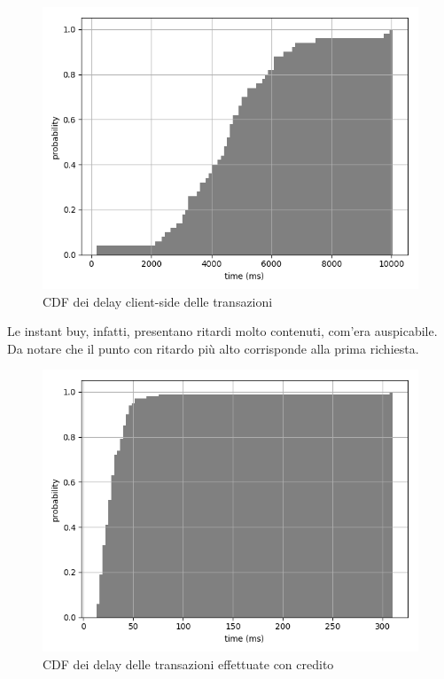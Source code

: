 \begin{figure}[h!t]
\centerline{\includegraphics[width=\textwidth]{img/client-side-delay-grey}}
\caption{CDF dei delay client-side delle transazioni}
\label{f:calcoli:client}
\end{figure}

Le instant buy, infatti, presentano ritardi molto contenuti, com'era auspicabile. Da notare che il punto con ritardo più alto corrisponde alla prima richiesta.

\begin{figure}[h!t]
\centerline{\includegraphics[width=\textwidth]{img/instant-buy-delay-grey}}
\caption{CDF dei delay delle transazioni effettuate con credito}
\label{f:calcoli:instant}
\end{figure}

